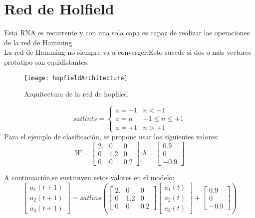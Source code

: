 \documentclass{article}
\begin{document}
\section{Red de Holfield}
Esta RNA es recurrente y con una sola capa es capaz de realizar las operaciones de la red de Hamming.\\
La red de Hamming no siempre va a converger.Esto sucede si dos o más vectores prototipo son equidistantes.
\begin{figure}[h!]
	\caption{Arquitectura de la red de hopfiled}
	\centering
	\texttt{[image: hopfieldArchitecture]}
\end{figure}
\[satlints = \begin{cases} 
a=-1 & n < -1\\
a = n & -1 \leq n\leq +1 \\
a=+1 & n > +1
\end{cases}
\]
Para el ejemplo de clasificación, se propone usar los siguientes valores:\\
\[
W =
\begin{bmatrix}
2. &  0& 0\\
0 &  1.2& 0\\
0 &  0& 0.2
\end{bmatrix};
b = 
\begin{bmatrix}
0.9 \\
0 \\
-0.9
\end{bmatrix}
\]

A continuación,se sustituyen estos valores en el modelo:
\[
\begin{bmatrix}
a_1(t+1)\\
a_2(t+1)\\
a_3(t+1)
\end{bmatrix}
 = satlins( 
\begin{bmatrix}
2. &  0& 0\\
0 &  1.2& 0\\
0 &  0& 0.2
\end{bmatrix}
\begin{bmatrix}
a_1(t)\\
a_2(t)\\
a_3(t)
\end{bmatrix}
+
\begin{bmatrix}
0.9\\
0\\
-0.9
\end{bmatrix}
)
\]
\end{document}
